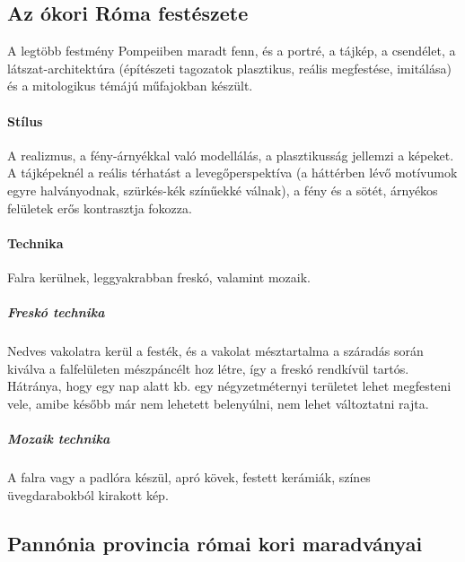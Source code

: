 \subsection*{Az ókori Róma festészete}

A legtöbb festmény Pompeiiben maradt fenn, és a portré, a tájkép, a csendélet, a látszat-architektúra (építészeti tagozatok plasztikus, reális megfestése, imitálása) és a mitologikus témájú műfajokban készült.

\paragraph{Stílus} A realizmus, a fény-árnyékkal való modellálás, a plasztikusság jellemzi a képeket. A tájképeknél a reális térhatást a levegőperspektíva (a háttérben lévő motívumok egyre halványodnak, szürkés-kék színűekké válnak), a fény és a sötét, árnyékos felületek erős kontrasztja fokozza.

\paragraph{Technika} Falra kerülnek, leggyakrabban freskó, valamint mozaik.

	\subparagraph{Freskó technika} 
	Nedves vakolatra kerül a festék, és a vakolat mésztartalma a száradás során kiválva a falfelületen mészpáncélt hoz létre, így a freskó rendkívül tartós. Hátránya, hogy egy nap alatt kb. egy négyzetméternyi területet lehet megfesteni vele, amibe később már nem lehetett belenyúlni, nem lehet változtatni rajta.
	
	\subparagraph{Mozaik technika} A falra vagy a padlóra készül, apró kövek, festett kerámiák, színes üvegdarabokból kirakott kép.
	
\vspace{1cm}	


\clearpage

\subsection*{Pannónia provincia római kori maradványai}

